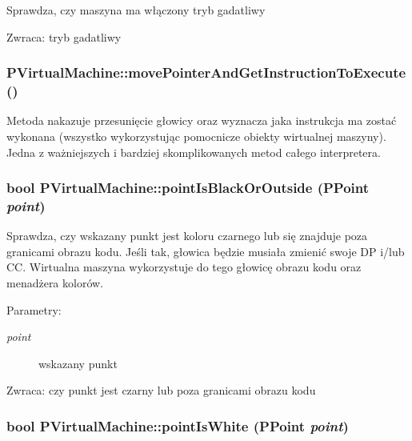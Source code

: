 Sprawdza, czy maszyna ma włączony tryb gadatliwy \begin{Desc}
\item[Zwraca:]tryb gadatliwy \end{Desc}
\hypertarget{classPVirtualMachine_29279548406a588bce03e320354cd857}{
\subsubsection[{movePointerAndGetInstructionToExecute}]{ PVirtualMachine::movePointerAndGetInstructionToExecute ()}}
\label{classPVirtualMachine_29279548406a588bce03e320354cd857}


Metoda nakazuje przesunięcie głowicy oraz wyznacza jaka instrukcja ma zostać wykonana (wszystko wykorzystując pomocnicze obiekty wirtualnej maszyny). Jedna z ważniejszych i bardziej skomplikowanych metod całego interpretera. \hypertarget{classPVirtualMachine_6daa9fea05af4bfc30b881c893fbd725}{
\subsubsection[{pointIsBlackOrOutside}]{\setlength{\rightskip}{0pt plus 5cm}bool PVirtualMachine::pointIsBlackOrOutside (PPoint {\em point})}}
\label{classPVirtualMachine_6daa9fea05af4bfc30b881c893fbd725}


Sprawdza, czy wskazany punkt jest koloru czarnego lub się znajduje poza granicami obrazu kodu. Jeśli tak, głowica będzie musiała zmienić swoje DP i/lub CC. Wirtualna maszyna wykorzystuje do tego głowicę obrazu kodu oraz menadżera kolorów. \begin{Desc}
\item[Parametry:]
\begin{description}
\item[{\em point}]wskazany punkt \end{description}
\end{Desc}
\begin{Desc}
\item[Zwraca:]czy punkt jest czarny lub poza granicami obrazu kodu \end{Desc}
\hypertarget{classPVirtualMachine_cae537f70c35487220818e8d18978e07}{
\subsubsection[{pointIsWhite}]{\setlength{\rightskip}{0pt plus 5cm}bool PVirtualMachine::pointIsWhite (PPoint {\em point})}}
\label{classPVirtualMachine_cae537f70c35487220818e8d18978e07}


